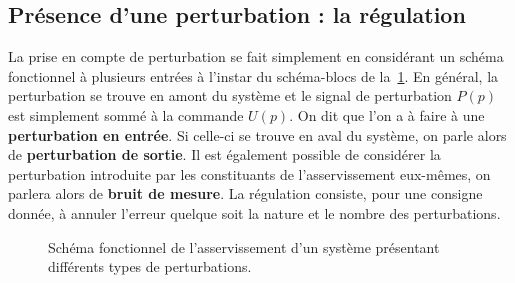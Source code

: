 \subsection{Présence d'une perturbation : la régulation}
La prise en compte de perturbation se fait simplement en considérant un schéma
fonctionnel à plusieurs entrées à l'instar du schéma-blocs de 
la~\cref{fig-pert2-chap_asserv}. En général, la perturbation se trouve en amont
du système et le signal de perturbation $P(p)$ est simplement sommé à la 
commande $U(p)$. On dit que l'on a à faire à une \textbf{perturbation 
en entrée}. Si celle-ci se trouve en aval du système, on parle alors de 
\textbf{perturbation de sortie}. Il est également possible de considérer la 
perturbation introduite par les constituants de l'asservissement eux-mêmes, 
on parlera alors de \textbf{bruit de mesure}.
La régulation consiste, pour une consigne donnée, à annuler l'erreur 
quelque soit la nature et le nombre des perturbations.
%    

\begin{figure}[!h]
    \centering
    
    \caption{Schéma fonctionnel de l'asservissement d'un système 
             présentant différents types de perturbations. \label{fig-pert2-chap_asserv}}
\end{figure}
